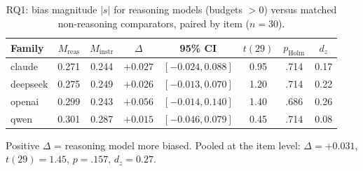 \begin{table}[!t]
\centering
\caption{RQ1: bias magnitude $|s|$ for reasoning models (budgets $>0$) versus matched non-reasoning comparators, paired by item ($n=30$).}
\label{tab:rq1}
\footnotesize
\setlength{\tabcolsep}{2.6pt}
\begin{tabular}{lccccccc}
\hline
Family & $M_{\text{reas}}$ & $M_{\text{instr}}$ & $\Delta$ & 95\% CI & $t(29)$ & $p_{\text{Holm}}$ & $d_z$ \\
\hline
claude & 0.271 & 0.244 & $+0.027$ & $[-0.024, 0.088]$ & 0.95 & .714 & 0.17 \\
deepseek & 0.275 & 0.249 & $+0.026$ & $[-0.013, 0.070]$ & 1.20 & .714 & 0.22 \\
openai & 0.299 & 0.243 & $+0.056$ & $[-0.014, 0.140]$ & 1.40 & .686 & 0.26 \\
qwen & 0.301 & 0.287 & $+0.015$ & $[-0.046, 0.079]$ & 0.45 & .714 & 0.08 \\
\hline
\end{tabular}
\par\smallskip\footnotesize Positive $\Delta$ = reasoning model more biased. Pooled at the item level: $\Delta = +0.031$, $t(29)=1.45$, $p=.157$, $d_z=0.27$.
\end{table}
